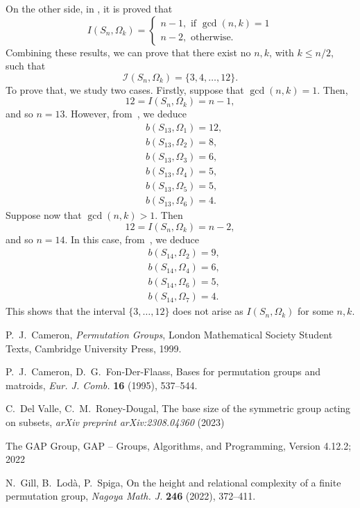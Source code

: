 \documentclass{amsart}
\begin{document}
	
	 On the other side, in \cite[Theorem 1.1]{LG}, it is proved that
	\[
		I(S_n,\Omega_k) = 
		\begin{cases}
			n-1, \text{ if } \gcd(n,k)=1 \\
			n-2, \text{ otherwise.}
		\end{cases}
	\]
	Combining these results, we can prove that there exist no $n,k$, with $ k \leq n/2$, such that 
	\[
		\mathcal{I}(S_n,\Omega_k)=\{3,4,\dots,12\}.
	\]
	To prove that, we study two cases. Firstly, suppose that $\gcd(n,k) = 1$. Then,
	\[
		12 = I(S_n,\Omega_k) = n-1,
	\]
	and so $n=13$. However, from~\cite[Table~1]{MSp}, we deduce
	\begin{align*}
		&b(S_{13},\Omega_1) = 12, \\
		&b(S_{13},\Omega_2) = 8, \\
		&b(S_{13},\Omega_3) = 6, \\
		&b(S_{13},\Omega_4) = 5, \\
		&b(S_{13},\Omega_5) = 5, \\
		&b(S_{13},\Omega_6) = 4.
	\end{align*}
	Suppose now that $\gcd(n,k) > 1$. Then 
	\[
		12 = I(S_n,\Omega_k) = n-2,
	\]
	and so $n=14$. In this case, from~\cite[Table~1]{MSp}, we deduce
	\begin{align*}
		&b(S_{14},\Omega_2) = 9, \\
		&b(S_{14},\Omega_4) = 6, \\
		&b(S_{14},\Omega_6) = 5, \\
		&b(S_{14},\Omega_7) = 4.
	\end{align*}
	This shows that the interval $\{3,\dots,12\}$ does not arise as $I(S_n,\Omega_k)$ for some $n,k$.
	
	
	
	P.~J.~Cameron, \textit{Permutation Groups}, London Mathematical Society Student Texts, Cambridge University Press, 1999. 
	
	
	P.~J.~Cameron, D.~G.~Fon-Der-Flaass, Bases for permutation groups and matroids, \textit{Eur. J. Comb.} \textbf{16} (1995), 537--544.
	
	
	C.~Del Valle, C.~M.~Roney-Dougal, The base size of the symmetric group acting on subsets, \textit{arXiv preprint arXiv:2308.04360} (2023)

	
	The GAP Group, GAP -- Groups, Algorithms, and Programming, Version 4.12.2; 2022
	
	 N.~Gill, B.~Lod\`{a}, P.~Spiga,
	On the height and relational complexity of a finite permutation group, \textit{Nagoya Math. J.} \textbf{246} (2022), 372--411.
	
\end{document}
